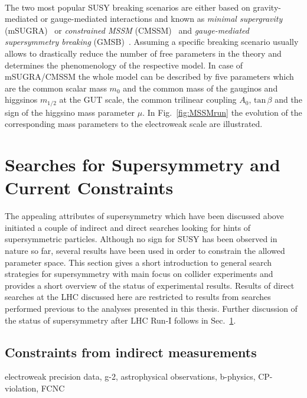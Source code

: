 \\
The two most popular SUSY breaking scenarios are either based on gravity-mediated or gauge-mediated interactions and known as \textit{minimal supergravity} (mSUGRA)~\cite{Chamseddine:1982jx, AlvarezGaume:1983gj} or \textit{constrained MSSM} (CMSSM)~\cite{Kane:1993td, Baer:2002gm} and \textit{gauge-mediated supersymmetry breaking} (GMSB)~\cite{Dine:1981gu, AlvarezGaume:1981wy}. Assuming a specific breaking scenario usually allows to drastically reduce the number of free parameters in the theory and determines the phenomenology of the respective model. In case of mSUGRA/CMSSM the whole model can be described by five parameters which are the common scalar mass $m_0$ and the common mass of the gauginos and higgsinos $m_{1/2}$ at the GUT scale, the common trilinear coupling $A_0$, $\mathrm{tan} \, \beta$ and the sign of the higgsino mass parameter $\mu$. In Fig.~\ref{fig:MSSMrun} the evolution of the corresponding mass parameters to the electroweak scale are illustrated.  

\section{Searches for Supersymmetry and Current Constraints}
\label{sec:susy_status}
The appealing attributes of supersymmetry which have been discussed above initiated a couple of indirect and direct searches looking for hints of supersymmetric particles. Although no sign for SUSY has been observed in nature so far, several results have been used in order to constrain the allowed parameter space. This section gives a short introduction to general search strategies for supersymmetry with main focus on collider experiments and provides a short overview of the status of experimental results. Results of direct searches at the LHC discussed here are restricted to results from searches performed previous to the analyses presented in this thesis. Further discussion of the status of supersymmetry after LHC Run-I follows in Sec.~\ref{sec:susy_status}.  

\subsection{Constraints from indirect measurements}
\label{subsec:susy_indirect}
electroweak precision data, g-2, astrophysical observations, b-physics, CP-violation, FCNC

